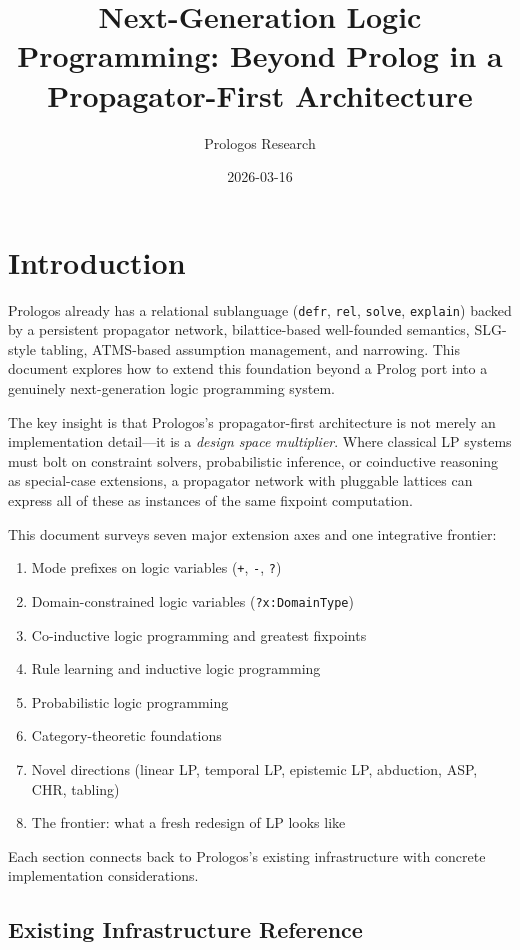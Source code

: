 \documentclass[11pt]{article}
\author{Prologos Research}
\date{2026-03-16}
\title{Next-Generation Logic Programming: Beyond Prolog in a Propagator-First Architecture}
\begin{document}
\maketitle
\setcounter{tocdepth}{3}
\tableofcontents

\section{Introduction}
\label{sec:org8580cbc}

Prologos already has a relational sublanguage (\texttt{defr}, \texttt{rel}, \texttt{solve}, \texttt{explain})
backed by a persistent propagator network, bilattice-based well-founded semantics,
SLG-style tabling, ATMS-based assumption management, and narrowing. This document
explores how to extend this foundation beyond a Prolog port into a genuinely
next-generation logic programming system.

The key insight is that Prologos's propagator-first architecture is not merely an
implementation detail---it is a \emph{design space multiplier}. Where classical LP
systems must bolt on constraint solvers, probabilistic inference, or coinductive
reasoning as special-case extensions, a propagator network with pluggable lattices
can express all of these as instances of the same fixpoint computation.

This document surveys seven major extension axes and one integrative frontier:

\begin{enumerate}
\item Mode prefixes on logic variables (\texttt{+}, \texttt{-}, \texttt{?})
\item Domain-constrained logic variables (\texttt{?x:DomainType})
\item Co-inductive logic programming and greatest fixpoints
\item Rule learning and inductive logic programming
\item Probabilistic logic programming
\item Category-theoretic foundations
\item Novel directions (linear LP, temporal LP, epistemic LP, abduction, ASP, CHR, tabling)
\item The frontier: what a fresh redesign of LP looks like
\end{enumerate}

Each section connects back to Prologos's existing infrastructure with concrete
implementation considerations.
\subsection{Existing Infrastructure Reference}
\label{sec:org89bb739}
\end{document}
